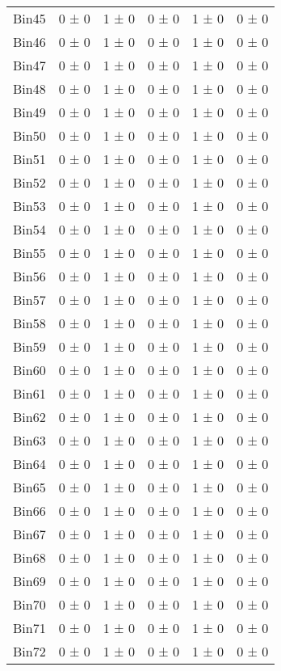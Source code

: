 \begin{tabular}{@{\extracolsep{4pt}}lccccc@{}}
     Bin45 & 0 ± 0 & 1 ± 0 & 0 ± 0 & 1 ± 0 & 0 ± 0 \\ 
     Bin46 & 0 ± 0 & 1 ± 0 & 0 ± 0 & 1 ± 0 & 0 ± 0 \\ 
     Bin47 & 0 ± 0 & 1 ± 0 & 0 ± 0 & 1 ± 0 & 0 ± 0 \\ 
     Bin48 & 0 ± 0 & 1 ± 0 & 0 ± 0 & 1 ± 0 & 0 ± 0 \\ 
     Bin49 & 0 ± 0 & 1 ± 0 & 0 ± 0 & 1 ± 0 & 0 ± 0 \\ 
     Bin50 & 0 ± 0 & 1 ± 0 & 0 ± 0 & 1 ± 0 & 0 ± 0 \\ 
     Bin51 & 0 ± 0 & 1 ± 0 & 0 ± 0 & 1 ± 0 & 0 ± 0 \\ 
     Bin52 & 0 ± 0 & 1 ± 0 & 0 ± 0 & 1 ± 0 & 0 ± 0 \\ 
     Bin53 & 0 ± 0 & 1 ± 0 & 0 ± 0 & 1 ± 0 & 0 ± 0 \\ 
     Bin54 & 0 ± 0 & 1 ± 0 & 0 ± 0 & 1 ± 0 & 0 ± 0 \\ 
     Bin55 & 0 ± 0 & 1 ± 0 & 0 ± 0 & 1 ± 0 & 0 ± 0 \\ 
     Bin56 & 0 ± 0 & 1 ± 0 & 0 ± 0 & 1 ± 0 & 0 ± 0 \\ 
     Bin57 & 0 ± 0 & 1 ± 0 & 0 ± 0 & 1 ± 0 & 0 ± 0 \\ 
     Bin58 & 0 ± 0 & 1 ± 0 & 0 ± 0 & 1 ± 0 & 0 ± 0 \\ 
     Bin59 & 0 ± 0 & 1 ± 0 & 0 ± 0 & 1 ± 0 & 0 ± 0 \\ 
     Bin60 & 0 ± 0 & 1 ± 0 & 0 ± 0 & 1 ± 0 & 0 ± 0 \\ 
     Bin61 & 0 ± 0 & 1 ± 0 & 0 ± 0 & 1 ± 0 & 0 ± 0 \\ 
     Bin62 & 0 ± 0 & 1 ± 0 & 0 ± 0 & 1 ± 0 & 0 ± 0 \\ 
     Bin63 & 0 ± 0 & 1 ± 0 & 0 ± 0 & 1 ± 0 & 0 ± 0 \\ 
     Bin64 & 0 ± 0 & 1 ± 0 & 0 ± 0 & 1 ± 0 & 0 ± 0 \\ 
     Bin65 & 0 ± 0 & 1 ± 0 & 0 ± 0 & 1 ± 0 & 0 ± 0 \\ 
     Bin66 & 0 ± 0 & 1 ± 0 & 0 ± 0 & 1 ± 0 & 0 ± 0 \\ 
     Bin67 & 0 ± 0 & 1 ± 0 & 0 ± 0 & 1 ± 0 & 0 ± 0 \\ 
     Bin68 & 0 ± 0 & 1 ± 0 & 0 ± 0 & 1 ± 0 & 0 ± 0 \\ 
     Bin69 & 0 ± 0 & 1 ± 0 & 0 ± 0 & 1 ± 0 & 0 ± 0 \\ 
     Bin70 & 0 ± 0 & 1 ± 0 & 0 ± 0 & 1 ± 0 & 0 ± 0 \\ 
     Bin71 & 0 ± 0 & 1 ± 0 & 0 ± 0 & 1 ± 0 & 0 ± 0 \\ 
     Bin72 & 0 ± 0 & 1 ± 0 & 0 ± 0 & 1 ± 0 & 0 ± 0 \\ 

\end{tabular}
